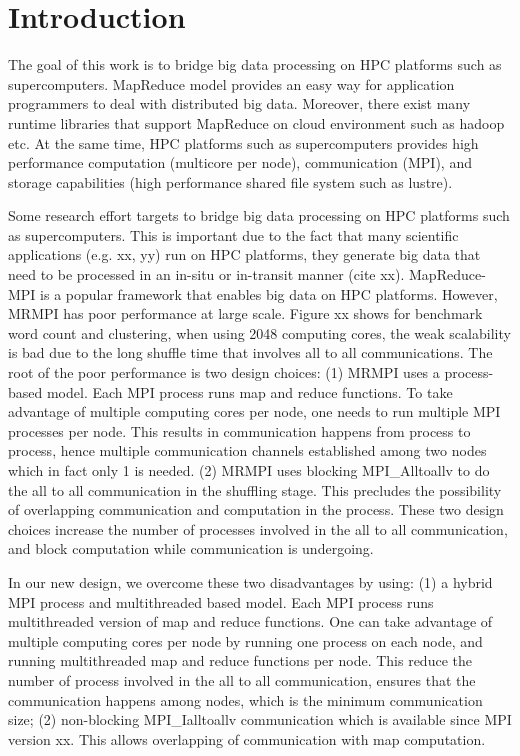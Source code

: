 \section{Introduction}
\label{introduction}

The goal of this work is to bridge big data processing on HPC platforms 
such as supercomputers. MapReduce model provides an easy way for
application programmers to deal with distributed big data. Moreover,
there exist many runtime libraries that support MapReduce on cloud
environment such as hadoop etc. At the same time, HPC platforms such
as supercomputers provides high performance computation (multicore per node),
 communication (MPI), and storage capabilities (high performance shared
 file system such as lustre).

Some research effort targets to bridge big data processing
on HPC platforms such as supercomputers. This is important due to
the fact that many scientific applications (e.g. xx, yy) run on HPC platforms,
they generate big data that need to be processed in an in-situ or in-transit manner
(cite xx). MapReduce-MPI is a popular framework that enables big data
on HPC platforms. However, MRMPI has poor performance at large
scale. Figure xx shows for benchmark word count and clustering,
when using 2048 computing cores, the weak scalability is bad due to
the long shuffle time that involves all to all communications. The root
of the poor performance is two design choices: (1) MRMPI uses a process-based
model. Each MPI process runs map and reduce functions. To take advantage
of multiple computing cores per node, one needs to run multiple MPI
processes per node. This results in communication happens 
from process to process, hence multiple communication channels established
among two nodes which in fact only 1 is needed. (2) MRMPI uses blocking
MPI\_Alltoallv to do the all to all communication in the shuffling stage. This
precludes the possibility of overlapping communication and computation
in the process. These two design choices increase the number of
processes involved in the all to all communication, and block computation
while communication is undergoing. 

In our new design, we overcome these two disadvantages by using:
(1) a hybrid MPI process and multithreaded based model. Each MPI
process runs multithreaded version of map and reduce functions. One
can take advantage of multiple computing cores per node by running
one process on each node, and running multithreaded map and reduce
functions per node. This reduce the number of process involved in the
all to all communication, ensures that the communication happens 
among nodes, which is the minimum communication size; (2) non-blocking
MPI\_Ialltoallv communication which is available since MPI version xx.
This allows overlapping of communication with map computation.

